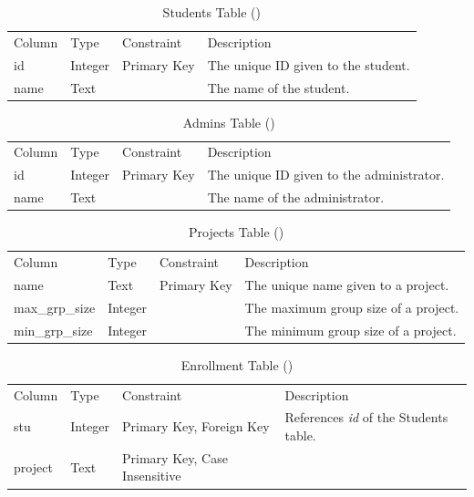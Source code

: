 \documentclass[12pt,letterpaper]{article}
\begin{document}
\begin{table}[H]
	\caption{Students Table ()} 
	\begin{tabu} to \textwidth {l l l X}
		\tableheader{}Column & Type & Constraint & Description \\
		id   & Integer & Primary Key & The unique ID given to the student. \\
		name & Text    &             & The name of the student. \\
	\end{tabu}
\end{table}

\begin{table}[H]
	\caption{Admins Table ()} 
	\begin{tabu} to \textwidth {l l l X}
		\tableheader{}Column & Type & Constraint & Description \\
		id   & Integer & Primary Key & The unique ID given to the administrator. \\
		name & Text    &             & The name of the administrator. \\
	\end{tabu}
\end{table}

\begin{table}[H]
	\caption{Projects Table ()} 
	\begin{tabu} to \textwidth {l l l X}
		\tableheader{}Column & Type & Constraint & Description \\
		name           & Text    & Primary Key & The unique name given to a project. \\
		max\_grp\_size & Integer &             & The maximum group size of a project. \\
		min\_grp\_size & Integer &             & The minimum group size of a project. \\
	\end{tabu}
\end{table}

\begin{table}[H]
	\caption{Enrollment Table ()} 
	\begin{tabu} to \textwidth {l l X X[3]}
		\tableheader{}Column & Type & Constraint & Description \\
		stu     & Integer & Primary Key,\newline
		                    Foreign Key          & References \textit{id} of the Students table. \\
		project & Text    & Primary Key,\newline
		                    Case Insensitive     &  \\
	\end{tabu}
\end{table}
\end{document}
